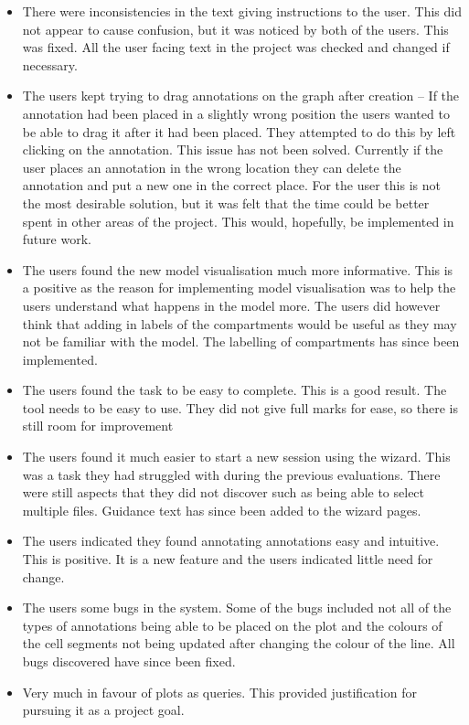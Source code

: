 \begin{itemize}
\item There were inconsistencies in the text giving instructions to the user.  This did not appear to cause confusion, but it was noticed by both of the users.  This was fixed.  All the user facing text in the project was checked and changed if necessary.
\item The users kept trying to drag annotations on the graph after creation --  If the annotation had been placed in a slightly wrong position the users wanted to be able to drag it after it had been placed.  They attempted to do this by left clicking on the annotation.  This issue has not been solved.  Currently if the user places an annotation in the wrong location they can delete the annotation and put a new one in the correct place.  For the user this is not the most desirable solution, but it was felt that the time could be better spent in other areas of the project.  This would, hopefully, be implemented in future work.
\item The users found the new model visualisation much more informative.  This is a positive as the reason for implementing model visualisation was to help the users understand what happens in the model more.  The users did however think that adding in labels of the compartments would be useful as they may not be familiar with the model.  The labelling of compartments has since been implemented.
\item The users found the task to be easy to complete.  This is a good result.  The tool needs to be easy to use.  They did not give full marks for ease, so there is still room for improvement
\item The users found it much easier to start a new session using the wizard.  This was a task they had struggled with during the previous evaluations.  There were still aspects that they did not discover such as being able to select multiple files.  Guidance text has since been added to the wizard pages.
\item The users indicated they found annotating annotations easy and intuitive.  This is positive.  It is a new feature and the users indicated little need for change.
\item The users some bugs in the system.  Some of the bugs included not all of the types of annotations being able to be placed on the plot and the colours of the cell segments not being updated after changing the colour of the line.  All bugs discovered have since been fixed.
\item Very much in favour of plots as queries.  This provided justification for pursuing it as a project goal.

\end{itemize}
